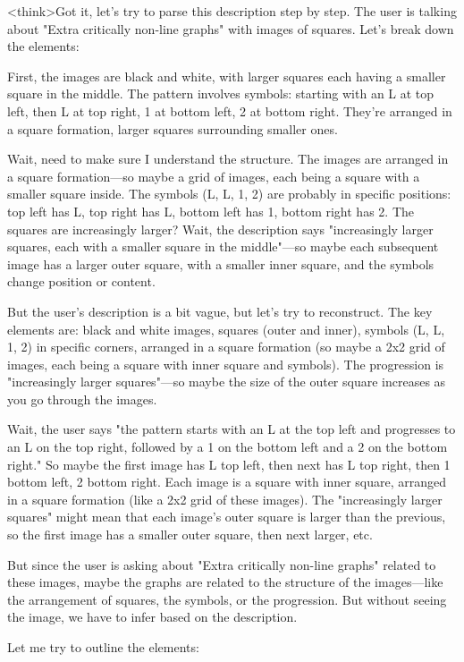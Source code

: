 <think>Got it, let's try to parse this description step by step. The user is talking about "Extra critically non-line graphs" with images of squares. Let's break down the elements:

First, the images are black and white, with larger squares each having a smaller square in the middle. The pattern involves symbols: starting with an L at top left, then L at top right, 1 at bottom left, 2 at bottom right. They're arranged in a square formation, larger squares surrounding smaller ones.

Wait, need to make sure I understand the structure. The images are arranged in a square formation—so maybe a grid of images, each being a square with a smaller square inside. The symbols (L, L, 1, 2) are probably in specific positions: top left has L, top right has L, bottom left has 1, bottom right has 2. The squares are increasingly larger? Wait, the description says "increasingly larger squares, each with a smaller square in the middle"—so maybe each subsequent image has a larger outer square, with a smaller inner square, and the symbols change position or content.

But the user's description is a bit vague, but let's try to reconstruct. The key elements are: black and white images, squares (outer and inner), symbols (L, L, 1, 2) in specific corners, arranged in a square formation (so maybe a 2x2 grid of images, each being a square with inner square and symbols). The progression is "increasingly larger squares"—so maybe the size of the outer square increases as you go through the images.

Wait, the user says "the pattern starts with an L at the top left and progresses to an L on the top right, followed by a 1 on the bottom left and a 2 on the bottom right." So maybe the first image has L top left, then next has L top right, then 1 bottom left, 2 bottom right. Each image is a square with inner square, arranged in a square formation (like a 2x2 grid of these images). The "increasingly larger squares" might mean that each image's outer square is larger than the previous, so the first image has a smaller outer square, then next larger, etc.

But since the user is asking about "Extra critically non-line graphs" related to these images, maybe the graphs are related to the structure of the images—like the arrangement of squares, the symbols, or the progression. But without seeing the image, we have to infer based on the description.

Let me try to outline the elements:

